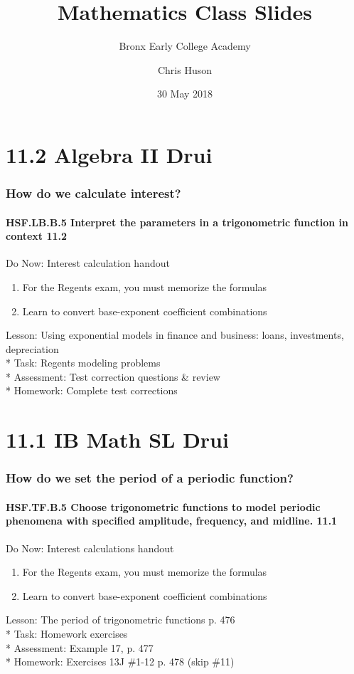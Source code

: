 \documentclass{beamer}
\title{Mathematics Class Slides}
\subtitle{Bronx Early College Academy}
\author{Chris Huson}
\date{30 May 2018}
\begin{document}
\frame{\titlepage}


\section{11.2 Algebra II Drui}
\frame
{
  \frametitle{How do we calculate interest?}
  \framesubtitle{HSF.LB.B.5 Interpret the parameters in a trigonometric function in context \qquad \alert{11.2}}

  \begin{block}{Do Now: Interest calculation handout}
  \begin{enumerate}
    \item For the Regents exam, you must memorize the formulas
    \item Learn to convert base-exponent coefficient combinations
    \end{enumerate}
  \end{block}
  Lesson: Using exponential models in finance and business: loans, investments, depreciation\\*
  Task: Regents modeling problems\\*
  Assessment: Test correction questions \& review\\*
  Homework: Complete test corrections\\}


\section{11.1 IB Math SL Drui}
\frame
{
  \frametitle{How do we set the period of a periodic function?}
  \framesubtitle{HSF.TF.B.5 Choose trigonometric functions to model periodic phenomena with specified amplitude, frequency, and midline. \qquad \alert{11.1}}

\begin{block}{Do Now: Interest calculations handout}
  \begin{enumerate}
    \item For the Regents exam, you must memorize the formulas
    \item Learn to convert base-exponent coefficient combinations
    \end{enumerate}
  \end{block}
  Lesson: The period of trigonometric functions p. 476\\*
  Task: Homework exercises\\*
  Assessment: Example 17, p. 477\\*
  Homework:  Exercises 13J \#1-12 p. 478 (skip \#11)\\
}
\end{document}
